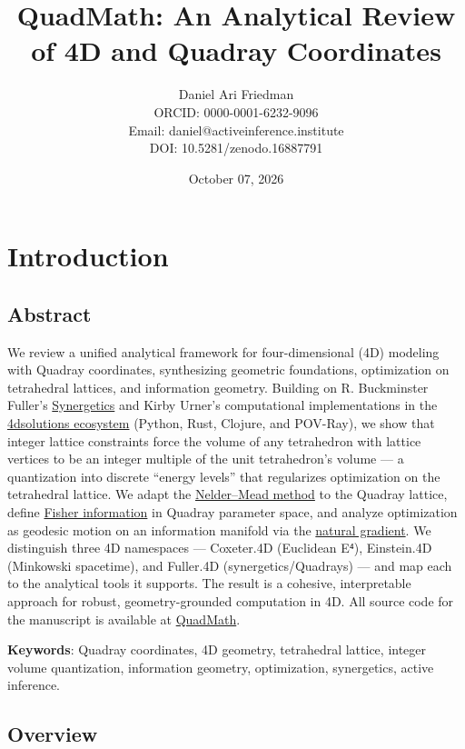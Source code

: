 \documentclass[
  10pt,
]{article}
\title{QuadMath: An Analytical Review of 4D and Quadray Coordinates}
\author{Daniel Ari Friedman\\ ORCID: 0000-0001-6232-9096\\ Email: daniel@activeinference.institute\\ DOI: 10.5281/zenodo.16887791}
\date{October 07, 2026}
\begin{document}
\maketitle

{
\hypersetup{linkcolor=black}
\setcounter{tocdepth}{3}
\tableofcontents
}
\section{Introduction}\label{introduction}

\subsection{Abstract}\label{abstract}

We review a unified analytical framework for four-dimensional (4D)
modeling with Quadray coordinates, synthesizing geometric foundations,
optimization on tetrahedral lattices, and information geometry. Building
on R. Buckminster Fuller's
\href{https://en.wikipedia.org/wiki/Synergetics_(Fuller)}{Synergetics}
and Kirby Urner's computational implementations in the
\href{https://github.com/4dsolutions}{4dsolutions ecosystem} (Python,
Rust, Clojure, and POV-Ray), we show that integer lattice constraints
force the volume of any tetrahedron with lattice vertices to be an
integer multiple of the unit tetrahedron's volume --- a quantization
into discrete ``energy levels'' that regularizes optimization on the
tetrahedral lattice. We adapt the
\href{https://en.wikipedia.org/wiki/Nelder\%E2\%80\%93Mead_method}{Nelder--Mead
method} to the Quadray lattice, define
\href{https://en.wikipedia.org/wiki/Fisher_information}{Fisher
information} in Quadray parameter space, and analyze optimization as
geodesic motion on an information manifold via the
\href{https://en.wikipedia.org/wiki/Natural_gradient}{natural gradient}.
We distinguish three 4D namespaces --- Coxeter.4D (Euclidean E⁴),
Einstein.4D (Minkowski spacetime), and Fuller.4D (synergetics/Quadrays)
--- and map each to the analytical tools it supports. The result is a
cohesive, interpretable approach for robust, geometry-grounded
computation in 4D. All source code for the manuscript is available at
\href{https://github.com/docxology/quadmath}{QuadMath}.

\textbf{Keywords}: Quadray coordinates, 4D geometry, tetrahedral
lattice, integer volume quantization, information geometry,
optimization, synergetics, active inference.

\subsection{Overview}\label{overview}
\end{document}
